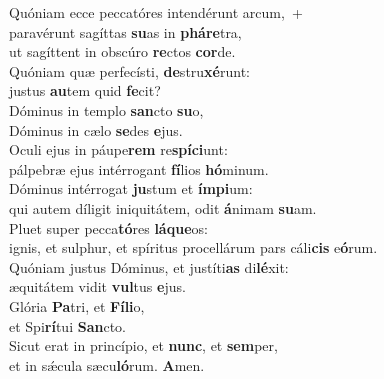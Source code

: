 \evenverse Quóniam ecce peccatóres intendérunt arcum,~+\\\evenverse  paravérunt sagíttas \textbf{su}as in \textbf{phá}\textbf{re}tra,~\*\\
\evenverse ut sagíttent in obscúro \textbf{re}ctos \textbf{cor}de.\\
\oddverse Quóniam quæ perfecísti, \textbf{de}stru\textbf{xé}runt:~\*\\
\oddverse justus \textbf{au}tem quid \textbf{fe}cit?\\
\evenverse Dóminus in templo \textbf{san}cto \textbf{su}o,~\*\\
\evenverse Dóminus in cælo \textbf{se}des \textbf{e}jus.\\
\oddverse Oculi ejus in páupe\textbf{rem} re\textbf{spí}\textbf{ci}unt:~\*\\
\oddverse pálpebræ ejus intérrogant \textbf{fí}lios \textbf{hó}minum.\\
\evenverse Dóminus intérrogat \textbf{ju}stum et \textbf{ím}\textbf{pi}um:~\*\\
\evenverse qui autem díligit iniquitátem, odit \textbf{á}nimam \textbf{su}am.\\
\oddverse Pluet super pecca\textbf{tó}res \textbf{lá}\textbf{que}os:~\*\\
\oddverse ignis, et sulphur, et spíritus procellárum pars cáli\textbf{cis} e\textbf{ó}rum.\\
\evenverse Quóniam justus Dóminus, et justíti\textbf{as} di\textbf{lé}xit:~\*\\
\evenverse æquitátem vidit \textbf{vul}tus \textbf{e}jus.\\
\oddverse Glória \textbf{Pa}tri, et \textbf{Fí}\textbf{li}o,~\*\\
\oddverse et Spi\textbf{rí}tui \textbf{San}cto.\\
\evenverse Sicut erat in princípio, et \textbf{nunc}, et \textbf{sem}per,~\*\\
\evenverse et in sǽcula sæcu\textbf{ló}rum. \textbf{A}men.\\
